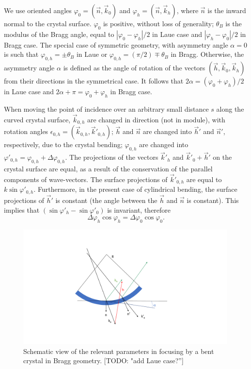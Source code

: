 \documentclass[preprint]{iucr}              %
\newcommand{\todo}[1]{{\color{red}[TODO: "#1'']}}
\begin{document}
We use oriented angles $\varphi_0 = (\vec n, \vec k_0)$ and $\varphi_h = (\vec n, \vec k_h)$, where $\vec n$ is the inward normal to the crystal surface. $\varphi_0$ is positive, without loss of generality; $\theta_B$ is the modulus of the Bragg angle, equal to $|\varphi_0-\varphi_h|/2$ in Laue case and  $|\varphi_h-\varphi_0|/2$ in Bragg case. The special case of symmetric geometry, with asymmetry angle $\alpha=0$ is such that $\varphi_{0,h}=\pm\theta_B$ in Laue or $\varphi_{0,h}=(\pi/2)\mp\theta_B$ in Bragg. Otherwise, the asymmetry angle $\alpha$ is defined as the angle of rotation of the vectors $(\vec h, \vec k_0, \vec k_h)$ from their directions in the symmetrical case. 
It follows that $2\alpha=(\varphi_0+\varphi_h)/2$ in Laue case and  $2\alpha+\pi=\varphi_0+\varphi_h$ in Bragg case.

When moving the point of incidence over an arbitrary small distance $s$ along the curved crystal surface, 
$\vec k_{0,h}$ are changed in direction (not in module), with rotation angles $\epsilon_{0,h} = (\vec k_{0,h},\vec k'_{0,h})$; $\vec h$ and $\vec n$ are changed into $\vec h'$ and $\vec n'$, respectively, due to the crystal bending;
$\varphi_{0,h}$ are changed into $\varphi'_{0,h}=\varphi_{0,h}+\Delta \varphi_{0,h}$.
The projections of the vectors $\vec k'_{h}$ and $\vec k'_{0}+\vec h'$ on the crystal surface are equal, as a result of the conservation of the parallel components of wave-vectors. The surface projections of $\vec k'_{0,h}$ 
are equal to $k \sin\varphi'_{0,h}$. Furthermore, in the present case of cylindrical bending, the surface projections of $\vec h'$ is constant (the angle between the $\vec h$ and $\vec n$ is constant).
This implies that $(\sin \varphi'_h - \sin \varphi'_0)$ is invariant, therefore
\begin{equation}
\label{eq:invariant}
    \Delta \varphi_h \cos\varphi_h = \Delta \varphi_0 \cos\varphi_0.
\end{equation}

\begin{figure}
\label{fig:vectors}
\caption{Schematic view of the relevant parameters in focusing by a bent crystal in Bragg geometry. \todo{add Laue case?}
}
\includegraphics[width=0.99\textwidth,trim=5cm 2cm 10cm 2cm,clip=true]{fig_vectors.pdf}
\end{figure}
\end{document}
